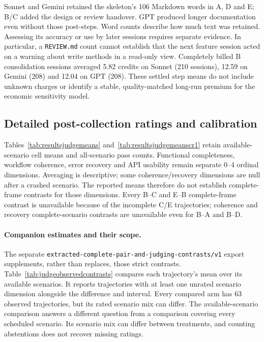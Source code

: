 Sonnet and Gemini retained the skeleton's 106 Markdown words in A, D
and E\@; B/C added the design or review handover. GPT produced longer
documentation even without those post-steps. Word counts describe how much text was retained. Assessing its accuracy
or use by later sessions requires separate evidence. In particular, a
\texttt{REVIEW.md} count cannot establish that the next feature session
acted on a warning about write methods in a read-only view.
Completely billed B consolidation sessions averaged 5.82 credits on
Sonnet (210 sessions), 12.59 on Gemini (208) and 12.04 on GPT (208).
These settled step means do not include unknown charges or identify a
stable, quality-matched long-run premium for the economic sensitivity model.

\FloatBarrier
\subsection{Detailed post-collection ratings and calibration}\label{app:judgingresultsdetail}

Tables~\ref{tab:resultsjudgemeans} and~\ref{tab:resultsjudgemeanscr1}
retain available-scenario cell means and all-scenario pass counts.
Functional completeness, workflow coherence, error recovery and API
usability remain separate 0--4 ordinal dimensions. Averaging is descriptive;
some coherence/recovery dimensions are null after a crashed scenario.
The reported means therefore do not establish complete-frame contrasts
for those dimensions. Every B--C and E--B complete-frame contrast is
unavailable because of the incomplete C/E trajectories; coherence and
recovery complete-scenario contrasts are unavailable even for B--A and B--D.

\paragraph{Companion estimates and their scope.}
The separate \nolinkurl{extracted-complete-pair-and-judging-contrasts/v1}
export supplements, rather than replaces, those strict contrasts.
Table~\ref{tab:judgeobservedcontrasts} compares each trajectory's mean over
its available scenarios. It reports trajectories with at least one
unrated scenario dimension alongside the difference and interval.
Every compared arm has 63 observed trajectories, but its rated scenario
mix can differ. The available-scenario comparison answers a different question from a
comparison covering every scheduled scenario. Its scenario mix can differ
between treatments, and counting abstentions does not recover missing ratings.

